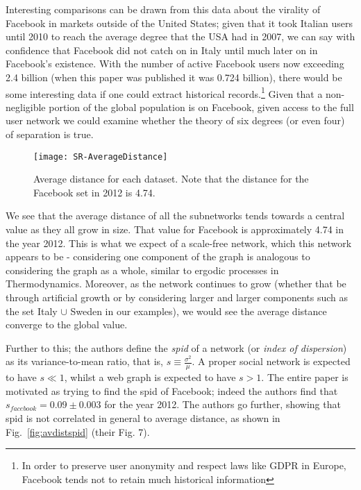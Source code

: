     Interesting comparisons can be drawn from this data about the virality of Facebook in markets outside of the United States; given that it took Italian users until 2010 to reach the average degree that the USA had in 2007, we can say with confidence that Facebook did not catch on in Italy until much later on in Facebook's existence. With the number of active Facebook users now exceeding 2.4 billion (when this paper was published it was 0.724 billion), there would be some interesting data if one could extract historical records.\footnote{In order to preserve user anonymity and respect laws like GDPR in Europe, Facebook tends not to retain much historical information} Given that a non-negligible portion of the global population is on Facebook, given access to the full user network we could examine whether the theory of six degrees (or even four) of separation is true.
    
    \begin{figure}[H]
        \centering
        \texttt{[image: SR-AverageDistance]}
        \caption{Average distance for each dataset. Note that the distance for the Facebook set in 2012 is 4.74.}
        \label{fig:avdist}
    \end{figure}
    
    We see that the average distance of all the subnetworks tends towards a central value as they all grow in size. That value for Facebook is approximately 4.74 in the year 2012. This is what we expect of a scale-free network, which this network appears to be - considering one component of the graph is analogous to considering the graph as a whole, similar to ergodic processes in Thermodynamics. Moreover, as the network continues to grow (whether that be through artificial growth or by considering larger and larger components such as the set Italy $\cup$ Sweden in our examples), we would see the average distance converge to the global value.
    
    Further to this; the authors define the \textit{spid} of a network (or \textit{index of dispersion}) as its variance-to-mean ratio, that is, $s\equiv\frac{\sigma^2}{\mu}$. A proper social network is expected to have $s\ll 1$, whilst a web graph is expected to have $s>1$. The entire paper is motivated as trying to find the spid of Facebook; indeed the authors find that $s_{facebook}=0.09\pm0.003$ for the year 2012. The authors go further, showing that spid is not correlated in general to average distance, as shown in Fig.~\ref{fig:avdistspid} (their Fig. 7).
    
